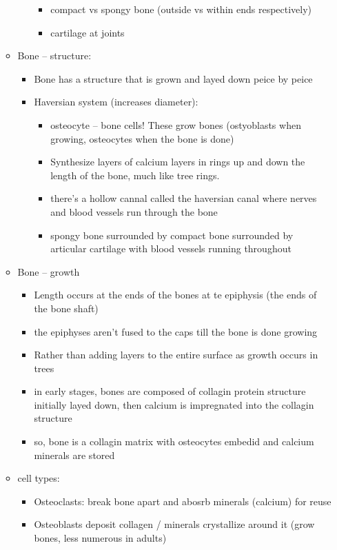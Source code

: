 \documentclass{article}
\theoremstyle{definition}
\begin{document}
\begin{itemize}
\begin{itemize}
\begin{itemize}
\begin{itemize}
							\item compact vs spongy bone (outside vs within ends respectively)
							\item cartilage at joints
						\end{itemize}
				\end{itemize}
			\item Bone -- structure:
				\begin{itemize}
					\item Bone has a structure that is grown and layed down peice by peice
					\item Haversian system (increases diameter):
						\begin{itemize}
							\item osteocyte -- bone cells! These grow bones (ostyoblasts when growing, osteocytes when the bone is done) 
							\item Synthesize layers of calcium layers in rings up and down the length of the bone, much like tree rings.
							\item there's a hollow cannal called the haversian canal where nerves and blood vessels run through the bone
							\item spongy bone surrounded by compact bone surrounded by articular cartilage with blood vessels running throughout
						\end{itemize}
				\end{itemize}
			\item Bone -- growth
				\begin{itemize}
					\item Length occurs at the ends of the bones at te epiphysis (the ends of the bone shaft)
					\item the epiphyses aren't fused to the caps till the bone is done growing
					\item Rather than adding layers to the entire surface as growth occurs in trees
					\item in early stages, bones are composed of collagin protein structure initially layed down, then calcium is impregnated into the collagin structure
					\item so, bone is a collagin matrix with osteocytes embedid and calcium minerals are stored
				\end{itemize}
			\item cell types:
				\begin{itemize}
					\item Osteoclasts: break bone apart and abosrb minerals (calcium) for reuse
					\item Osteoblasts deposit collagen / minerals crystallize around it (grow bones, less numerous in adults)

\end{itemize}
\end{itemize}
\end{itemize}
\end{document}
